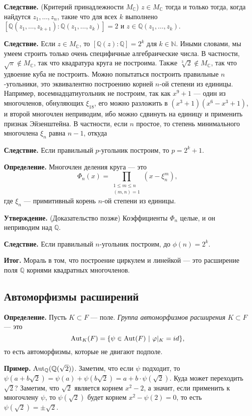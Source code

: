 \QED

\textbf{Следствие.} (Критерий принадлежности $M_\mathbb C$)
$z \in M_\mathbb C$ тогда и только тогда, когда найдутся $z_1, \dots, z_n$, такие что для всех $k$ выполнено $[\mathbb Q(z_1, \dots, z_{k+1}) : \mathbb Q(z_1, \dots, z_k)] = 2$ и $z \in \mathbb Q(z_1, \dots, z_k)$.

\textbf{Следствие.} Если $z \in M_\mathbb C$, то $[\mathbb Q(z) : \mathbb Q] = 2^k$ для $k \in \mathbb N$.
Иными словами, мы умеем строить только очень специфичные алгебраические числа.
В частности, $\sqrt \pi \not\in M_\mathbb C$, так что квадратура круга не построима.
Также $\sqrt[3]{2} \not\in M_\mathbb C$, так что удвоение куба не построить.
Можно попытаться построить правильные $n$-угольники, это эквивалентно построению корней $n$-ой степени из единицы.
Например, восемнадцатиугольник не построим, так как $x^9 + 1$ --- один из многочленов, обнуляющих $\xi_{18}$, его можно разложить в $(x^3 + 1)(x^6 - x^3 + 1)$, и второй многочлен неприводим, ибо можно сдвинуть на единицу и применить признак Эйзенштейна.
В частности, если $n$ простое, то степень минимального многочлена $\xi_n$ равна $n - 1$, откуда

\textbf{Следствие.} Если правильный $p$-угольник построим, то $p = 2^k + 1$.

\textbf{Определение.} Многочлен деления круга --- это
\[
    \Phi_n(x) = \prod_{\substack{1 \le m \le n \\ (m, n) = 1}} (x - \xi_n^m),
\]
где $\xi_n$ --- примитивный корень $n$-ой степени из единицы.

\textbf{Утверждение.} (Доказательство позже) Коэффициенты $\Phi_n$ целые, и он неприводим над $\mathbb Q$.

\textbf{Следствие.} Если правильный $n$-угольник построим, до $\phi(n) = 2^k$.

\textbf{Итог.} Мораль в том, что построение циркулем и линейкой --- это расширение поля $\mathbb Q$ корнями квадратных многочленов.

\subsection{Автоморфизмы расширений}
\textbf{Определение.} Пусть $K \subset F$ --- поле.
\textit{Группа автоморфизмов расширения} $K \subset F$ --- это
\[
    \operatorname{Aut}_K(F) = \{\psi \in \operatorname{Aut}(F)~|~\varphi|_K = id\},
\]
то есть автоморфизмы, которые не двигают подполе.

\textbf{Пример.} $\operatorname{Aut}_\mathbb Q (\mathbb Q(\sqrt 2))$.
Заметим, что если $\psi$ подходит, то $\psi(a + b \sqrt 2) = \psi(a) + \psi(b \sqrt 2) = a + b \cdot \psi(\sqrt 2)$.
Куда может переходить $\sqrt 2$? Заметим, что $\sqrt 2$ является корнем $x^2 - 2$, а значит, если применить к многочлену $\psi$, то $\psi(\sqrt 2)$ будет корнем $x^2 - \psi(2) = 0$, то есть $\psi(\sqrt 2) = \pm \sqrt 2$.

